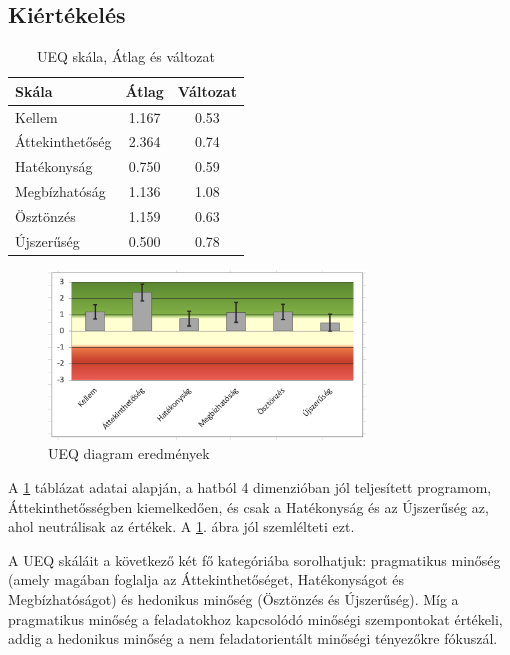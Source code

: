 \subsection{Kiértékelés}
\begin{table}[h]
    \centering
    \caption{UEQ skála, Átlag és változat}
    \begin{tabular}{|l|c|c|}
        \hline
        \textbf{Skála} & \textbf{Átlag} & \textbf{Változat} \\ \hline
        Kellem & 1.167 & 0.53 \\ \hline
        Áttekinthetőség & 2.364 & 0.74 \\ \hline
        Hatékonyság & 0.750 & 0.59 \\ \hline
        Megbízhatóság & 1.136 & 1.08 \\ \hline
        Ösztönzés & 1.159 & 0.63 \\ \hline
        Újszerűség & 0.500 & 0.78 \\ \hline
    \end{tabular}
    \label{tab:ueq_scales}
\end{table}

\begin{figure}[h]
    \center
    \includegraphics[width=0.75\textwidth]{img/UEQ_diagram.png}
    \caption{UEQ diagram eredmények}
    \label{diag:ueq}
\end{figure}

A \ref{tab:ueq_scales} táblázat adatai alapján, a hatból 4 dimenzióban jól teljesített  programom, Áttekinthetősségben kiemelkedően, és csak a Hatékonyság és az Újszerűség az, ahol neutrálisak az értékek. A \ref{diag:ueq}. ábra jól szemlélteti ezt. 


A UEQ skáláit a következő két fő kategóriába sorolhatjuk: pragmatikus minőség (amely magában foglalja az Áttekinthetőséget, Hatékonyságot és Megbízhatóságot) és hedonikus minőség (Ösztönzés és Újszerűség). Míg a pragmatikus minőség a feladatokhoz kapcsolódó minőségi szempontokat értékeli, addig a hedonikus minőség a nem feladatorientált minőségi tényezőkre fókuszál.

